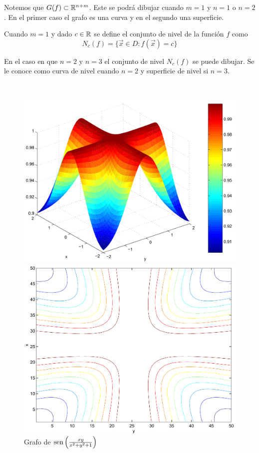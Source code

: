 Notemos que $G(f) \subset \mathbb{R}^{n+m}$. Este se podr\'a dibujar 
cuando $m=1$ y $n=1$ o $n=2$. En el primer caso el grafo es una curva y en el segundo una
superficie.
\begin{definicion} Cuando $m=1$ y dado $c\in \mathbb{R}$ se define el conjunto de nivel  de la funci\'on $f$ como
$$N_c(f)=\{\vec{x}\in D : f(\vec{x})=c\}$$
\end{definicion} 
En el caso en que $n=2$ y $n=3$ el conjunto de nivel $N_c(f)$ se puede dibujar.
Se le conoce como curva de nivel cuando $n=2$ y superficie de nivel si $n=3$.
\begin{ejemplo}\textcolor{white}{linea en blanco}
\begin{figure}[H]
\begin{minipage}[t]{.45\textwidth}
\centering
\includegraphics[width=\ScaleIfNeeded]{figuras/grafico-seno.pdf}
\caption{Grafo de $\text{sen}\left(\frac{xy}{x^2+y^2+1}\right)$}
\label{fig:GraficoSeno1}
\end{minipage}
\hfill
\begin{minipage}[t]{.45\textwidth}
\centering
\includegraphics[width=\ScaleIfNeeded]{figuras/curvasdenivel-seno.pdf}

\end{minipage}
\end{figure}
\end{ejemplo}
